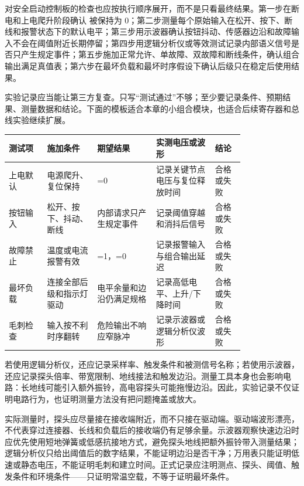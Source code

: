 对安全启动控制板的检查也应按执行顺序展开，而不是只看最终结果。第一步在断电和上电爬升阶段确认  被保持为 0；第二步测量每个原始输入在松开、按下、断线和报警状态下的默认电平；第三步用示波器确认按钮抖动、传感器边沿和故障输入不会在阈值附近长期停留；第四步用逻辑分析仪或等效测试记录内部语义信号是否只产生规定事件；第五步施加正常允许、单故障、双故障和断线条件，确认组合输出满足真值表；第六步在最坏负载和最坏时序假设下确认后级只在稳定后使用结果。

实验记录应当能让第三方复查。只写“测试通过”不够；至少要记录条件、预期结果、测量数据和结论。下面的模板适合本章的小组合模块，也适合后续寄存器和总线实验继续扩展。

\begin{longtable}{L{0.13\linewidth}L{0.17\linewidth}L{0.2\linewidth}L{0.2\linewidth}L{0.1\linewidth}}
\toprule
测试项 & 施加条件 & 期望结果 & 实测电压或波形 & 结论 \\
\midrule
上电默认 & 电源爬升、复位保持 & =0 & 记录关键节点电压与复位释放时间 & 合格或失败 \\\tablerowrule
按钮输入 & 松开、按下、抖动、断线 & 内部请求只产生规定事件 & 记录阈值穿越和消抖后信号 & 合格或失败 \\\tablerowrule
故障禁止 & 温度或电流报警有效 & =1，=0 & 记录报警输入与组合输出延迟 & 合格或失败 \\\tablerowrule
最坏负载 & 连接全部后级和指示灯驱动 & 电平余量和边沿仍满足规格 & 记录高低电平、上升/下降时间 & 合格或失败 \\\tablerowrule
毛刺检查 & 输入按不利时序翻转 & 危险输出不响应窄脉冲 & 记录示波器或逻辑分析仪波形 & 合格或失败 \\
\bottomrule
\end{longtable}

若使用逻辑分析仪，还应记录采样率、触发条件和被测信号名称；若使用示波器，还应记录探头倍率、带宽限制、地线接法和触发边沿。测量工具本身也会影响电路：长地线可能引入额外振铃，高电容探头可能拖慢边沿。因此，实验记录不仅证明电路行为，也证明测量方法没有把问题掩盖或放大。

实际测量时，探头应尽量接在接收端附近，而不只接在驱动端。驱动端波形漂亮，不代表穿过连接器、长线和负载后的接收端仍有足够余量。示波器观察快速边沿时应优先使用短地弹簧或低感抗接地方式，避免探头地线把额外振铃带入测量结果；逻辑分析仪只给出阈值后的数字结果，不能证明边沿是否干净；万用表只能证明低速或静态电压，不能证明毛刺和建立时间。正式记录应注明测点、探头、阈值、触发条件和环境条件——只证明常温空载，不等于证明最坏条件。

